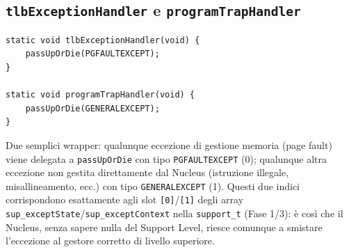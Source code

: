 \documentclass[11pt,a4paper]{article}
\newcommand{\code}[1]{\texttt{#1}}
\newcommand{\func}[1]{\textbf{\texttt{#1}}}
\begin{document}
\subsection{\func{tlbExceptionHandler} e \func{programTrapHandler}}
\begin{lstlisting}
static void tlbExceptionHandler(void) {
    passUpOrDie(PGFAULTEXCEPT);
}

static void programTrapHandler(void) {
    passUpOrDie(GENERALEXCEPT);
}
\end{lstlisting}
Due semplici wrapper: qualunque eccezione di gestione memoria (page fault)
viene delegata a \code{passUpOrDie} con tipo \code{PGFAULTEXCEPT} (0);
qualunque altra eccezione non gestita direttamente dal Nucleus (istruzione
illegale, misallineamento, ecc.) con tipo \code{GENERALEXCEPT} (1). Questi
due indici corrispondono esattamente agli slot \code{[0]}/\code{[1]} degli
array \code{sup\_exceptState}/\code{sup\_exceptContext} nella
\code{support\_t} (Fase 1/3): è così che il Nucleus, senza sapere nulla del
Support Level, riesce comunque a smistare l'eccezione al gestore corretto di
livello superiore.
\end{document}
